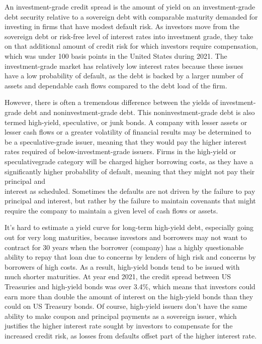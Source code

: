 \documentclass[11pt]{article}
\begin{document}
An investment-grade credit spread is the amount of yield on an investment-grade debt security relative to a sovereign debt with comparable maturity demanded for investing in firms that have modest default risk. As investors move from the sovereign debt or risk-free level of interest rates into investment grade, they take on that additional amount of credit risk for which investors require compensation, which was under 100 basis points in the United States during 2021. The investment-grade market has relatively low interest rates because these issues have a low probability of default, as the debt is backed by a larger number of assets and dependable cash flows compared to the debt load of the firm.

However, there is often a tremendous difference between the yields of investment-grade debt and noninvestment-grade debt. This noninvestment-grade debt is also termed high-yield, speculative, or junk bonds. A company with lesser assets or lesser cash flows or a greater volatility of financial results may be determined to be a speculative-grade issuer, meaning that they would pay the higher interest rates required of below-investment-grade issuers. Firms in the high-yield or speculativegrade category will be charged higher borrowing costs, as they have a significantly higher probability of default, meaning that they might not pay their principal and\\
interest as scheduled. Sometimes the defaults are not driven by the failure to pay principal and interest, but rather by the failure to maintain covenants that might require the company to maintain a given level of cash flows or assets.

It's hard to estimate a yield curve for long-term high-yield debt, especially going out for very long maturities, because investors and borrowers may not want to contract for 30 years when the borrower (company) has a highly questionable ability to repay that loan due to concerns by lenders of high risk and concerns by borrowers of high costs. As a result, high-yield bonds tend to be issued with much shorter maturities. At year end 2021, the credit spread between US Treasuries and high-yield bonds was over 3.4\%, which means that investors could earn more than double the amount of interest on the high-yield bonds than they could on US Treasury bonds. Of course, high-yield issuers don't have the same ability to make coupon and principal payments as a sovereign issuer, which justifies the higher interest rate sought by investors to compensate for the increased credit risk, as losses from defaults offset part of the higher interest rate.
\end{document}
